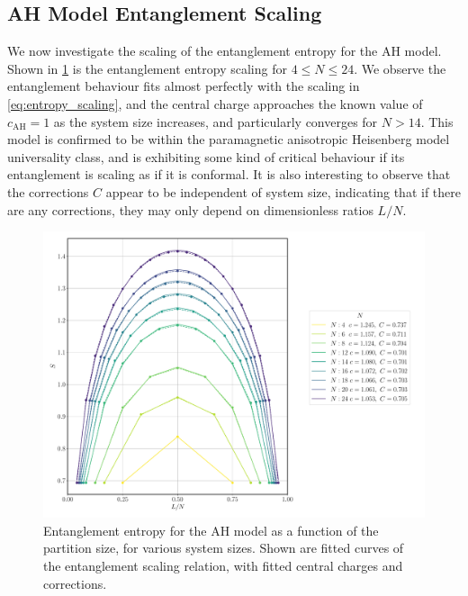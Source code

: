 \documentclass[12pt]{article}{}
\begin{document}
\subsection{AH Model Entanglement Scaling}
We now investigate the scaling of the entanglement entropy for the AH model. Shown in \cref{fig:ah_entanglement_partition} is the entanglement entropy scaling for $4 \leq N \leq 24$. We observe the entanglement behaviour fits almost perfectly with the scaling in \cref{eq:entropy_scaling}, and the central charge approaches the known value \cite{Cole2017} of $\boxed{c_{\textrm{AH}} = 1}$ as the system size increases, and particularly converges for $N>14$. This model is confirmed to be within the paramagnetic anisotropic Heisenberg model universality class, and is exhibiting some kind of critical behaviour if its entanglement is scaling as if it is conformal. It is also interesting to observe that the corrections $C$ appear to be independent of system size, indicating that if there are any corrections, they may only depend on dimensionless ratios $L/N$.
\begin{figure}[H]
  \centering
  \includegraphics[width=1\textwidth]{figures/ah/entanglement__partition__N__U__J.pdf}
  \caption{Entanglement entropy for the AH model as a function of the partition size, for various system sizes. Shown are fitted curves of the entanglement scaling relation, with fitted central charges and corrections.}
  \label{fig:ah_entanglement_partition}
\end{figure}
\end{document}
